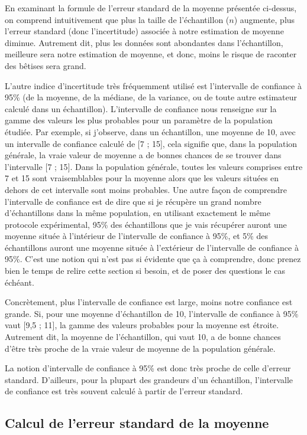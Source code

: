 \documentclass[
  a4paper,
  DIV=11,
  numbers=noendperiod,
  oneside]{scrreprt}
\begin{document}
En examinant la formule de l'erreur standard de la moyenne présentée
ci-dessus, on comprend intuitivement que plus la taille de l'échantillon
(\(n\)) augmente, plus l'erreur standard (donc l'incertitude) associée à
notre estimation de moyenne diminue. Autrement dit, plus les données
sont abondantes dans l'échantillon, meilleure sera notre estimation de
moyenne, et donc, moins le risque de raconter des bêtises sera grand.

L'autre indice d'incertitude très fréquemment utilisé est l'intervalle
de confiance à 95\% (de la moyenne, de la médiane, de la variance, ou de
toute autre estimateur calculé dans un échantillon). L'intervalle de
confiance nous renseigne sur la gamme des valeurs les plus probables
pour un paramètre de la population étudiée. Par exemple, si j'observe,
dans un échantillon, une moyenne de 10, avec un intervalle de confiance
calculé de {[}7 ; 15{]}, cela signifie que, dans la population générale,
la vraie valeur de moyenne a de bonnes chances de se trouver dans
l'intervalle {[}7 ; 15{]}. Dans la population générale, toutes les
valeurs comprises entre 7 et 15 sont vraisemblables pour la moyenne
alors que les valeurs situées en dehors de cet intervalle sont moins
probables. Une autre façon de comprendre l'intervalle de confiance est
de dire que si je récupère un grand nombre d'échantillons dans la même
population, en utilisant exactement le même protocole expérimental, 95\%
des échantillons que je vais récupérer auront une moyenne située à
l'intérieur de l'intervalle de confiance à 95\%, et 5\% des échantillons
auront une moyenne située à l'extérieur de l'intervalle de confiance à
95\%. C'est une notion qui n'est pas si évidente que ça à comprendre,
donc prenez bien le temps de relire cette section si besoin, et de poser
des questions le cas échéant.

Concrètement, plus l'intervalle de confiance est large, moins notre
confiance est grande. Si, pour une moyenne d'échantillon de 10,
l'intervalle de confiance à 95\% vaut {[}9,5 ; 11{]}, la gamme des
valeurs probables pour la moyenne est étroite. Autrement dit, la moyenne
de l'échantillon, qui vaut 10, a de bonne chances d'être très proche de
la vraie valeur de moyenne de la population générale.

La notion d'intervalle de confiance à 95\% est donc très proche de celle
d'erreur standard. D'ailleurs, pour la plupart des grandeurs d'un
échantillon, l'intervalle de confiance est très souvent calculé à partir
de l'erreur standard.

\hypertarget{calcul-de-lerreur-standard-de-la-moyenne}{%
\subsection{Calcul de l'erreur standard de la
moyenne}\label{calcul-de-lerreur-standard-de-la-moyenne}}
\end{document}
